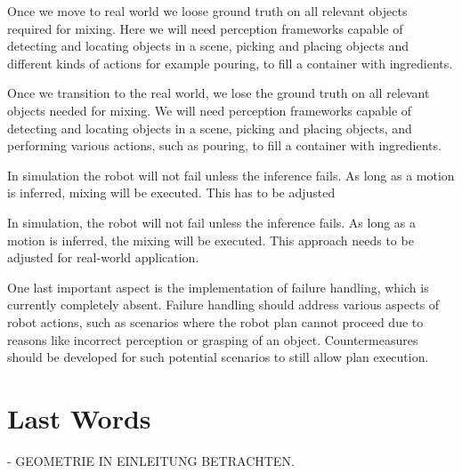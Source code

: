 Once we move to real world we loose ground truth on all relevant objects required for mixing.
Here we will need perception frameworks capable of detecting and locating objects in a scene, 
picking and placing objects and different kinds of actions for example pouring, to fill a container
with ingredients.

Once we transition to the real world, we lose the ground truth on all relevant objects needed for mixing. We will need perception frameworks capable of detecting and locating objects in a scene, picking and placing objects, and performing various actions, such as pouring, to fill a container with ingredients.

In simulation the robot will not fail unless the inference fails. As long as a motion is inferred, mixing will be executed.
This has to be adjusted

In simulation, the robot will not fail unless the inference fails. As long as a motion is inferred, the mixing will be executed. This approach needs to be adjusted for real-world application.

One last important aspect is the implementation of failure handling, which is currently completely absent. Failure handling should address various aspects of robot actions, such as scenarios where the robot plan cannot proceed due to reasons like incorrect perception or grasping of an object. Countermeasures should be developed for such potential scenarios to still allow plan execution.

\section{Last Words}

- GEOMETRIE IN EINLEITUNG BETRACHTEN.

